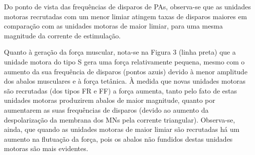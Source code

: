 Do ponto de vista das frequências de disparos de PAs, observa-se que as unidades motoras recrutadas com um menor limiar atingem taxas de disparos maiores em comparação com as unidades motoras de maior limiar, para uma mesma magnitude da corrente de estimulação.

Quanto à geração da força muscular, nota-se na Figura 3 (linha preta) que a unidade motora do tipo S gera uma força relativamente pequena, mesmo com o aumento da sua frequência de disparos (pontos azuis) devido à menor amplitude dos abalos musculares e à força tetânica. À medida que novas unidades motoras são recrutadas (dos tipos FR e FF) a força aumenta, tanto pelo fato de estas unidades motoras produzirem abalos de maior magnitude, quanto por aumentarem as suas frequências de disparos (devido ao aumento da despolarização da membrana dos MNs pela corrente triangular). Observa-se, ainda, que quando as unidades motoras de maior limiar são recrutadas há um aumento na flutuação da força, pois os abalos não fundidos destas unidades motoras são mais evidentes.

